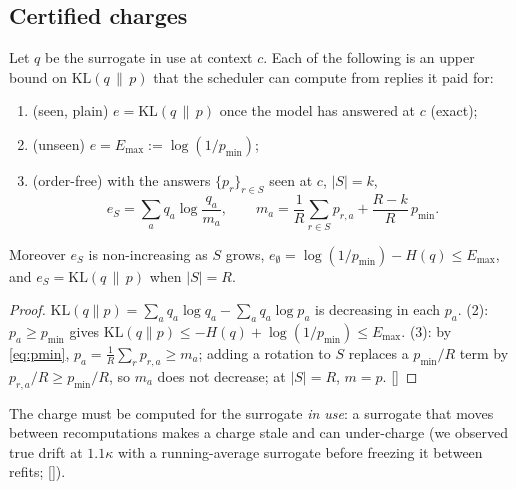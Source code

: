\subsection{Certified charges}
\begin{lemma}\label{lem:charge}
Let $q$ be the surrogate in use at context $c$. Each of the following is an upper bound on
$\mathrm{KL}(q\,\|\,p)$ that the scheduler can compute from replies it paid for:
\begin{enumerate}
  \item (seen, plain) $e=\mathrm{KL}(q\,\|\,p)$ once the model has answered at $c$ (exact);
  \item (unseen) $e=E_{\max}:=\log(1/p_{\min})$;
  \item (order-free) with the answers $\{p_r\}_{r\in S}$ seen at $c$, $|S|=k$,
  \[
    e_S=\sum_a q_a\log\frac{q_a}{m_a},\qquad m_a=\frac1R\sum_{r\in S}p_{r,a}+\frac{R-k}{R}\,p_{\min}.
  \]
\end{enumerate}
Moreover $e_S$ is non-increasing as $S$ grows, $e_\emptyset=\log(1/p_{\min})-H(q)\le E_{\max}$, and
$e_S=\mathrm{KL}(q\,\|\,p)$ when $|S|=R$.
\end{lemma}
\begin{proof}
$\mathrm{KL}(q\|p)=\sum_a q_a\log q_a-\sum_a q_a\log p_a$ is decreasing in each $p_a$. (2): $p_a\ge p_{\min}$
gives $\mathrm{KL}(q\|p)\le -H(q)+\log(1/p_{\min})\le E_{\max}$. (3): by \eqref{eq:pmin},
$p_a=\frac1R\sum_r p_{r,a}\ge m_a$; adding a rotation to $S$ replaces a $p_{\min}/R$ term by
$p_{r,a}/R\ge p_{\min}/R$, so $m_a$ does not decrease; at $|S|=R$, $m=p$.
[]
\end{proof}
The charge must be computed for the surrogate \emph{in use}: a surrogate that moves between
recomputations makes a charge stale and can under-charge (we observed true drift at $1.1\kappa$
with a running-average surrogate before freezing it between refits;
[]).

